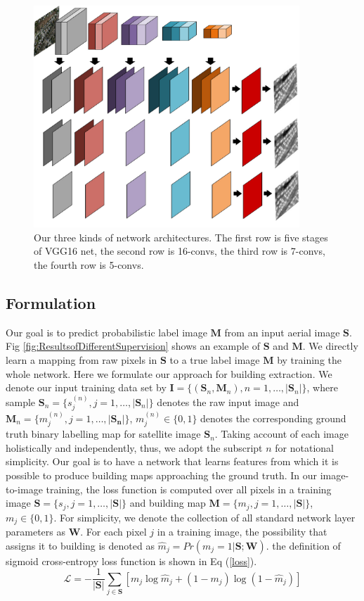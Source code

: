 \documentclass[runningheads]{llncs}
\begin{document}
\begin{figure}
\centering
\includegraphics[width=100mm]{ThreeFuseModes}
\caption{Our three kinds of network architectures. The first row is five stages of VGG16 net, the second row is 16-convs, the third row is 7-convs, the fourth row is 5-convs.}
\label{fig:ThreeFuseModes}
\end{figure}

\subsection{Formulation}
   Our goal is to predict probabilistic label image $\mathbf{M}$ from an input aerial image $\mathbf{S}$. Fig \ref{fig:ResultsofDifferentSupervision} shows an example of $\mathbf{S}$ and $\mathbf{M}$. We directly learn a mapping from raw pixels in $\mathbf{S}$ to a true label image  $\mathbf{M}$ by training the whole network. Here we formulate our approach for building extraction. We denote our input training data set by $\mathbf{I} = \{(\mathbf{S}_{n},\mathbf{M}_{n}),n = 1,\ldots,\vert \mathbf{S}_n \vert \}$, where sample $\mathbf{S}_{n} = \{s_{j}^{(n)}, j = 1,\ldots,\vert \mathbf{S}_n \vert \}$ denotes the raw input image and  $\mathbf{M}_{n} = \{m_{j}^{(n)}, j = 1,\ldots,\vert \mathbf{S_n} \vert\}$, $m_j^{(n)} \in \{0,1\}$ denotes the corresponding ground truth binary labelling map for satellite image $\mathbf{S}_{n}$.  Taking account of each image holistically and independently, thus, we adopt the subscript $n$ for notational simplicity. Our goal is to have a network that learns features from which it is possible to produce building maps approaching the ground truth. 
    In our image-to-image training, the loss function is computed over all pixels in a training image $\mathbf{S} = \{s_{j}, j = 1,\ldots,\vert \mathbf{S} \vert\}$ and building map $\mathbf{M} = \{m_{j}, j = 1,\ldots,\vert \mathbf{S} \vert\}$, $m_j \in \{0,1\}$.
For simplicity, we denote the collection of all standard network layer parameters as $\mathbf{W}$. For each pixel $j$ in a training image, the possibility that assigns it to building is denoted as $\hat{m}_j = Pr(m_j = 1|\mathbf{S};\mathbf{W})$. the definition of sigmoid cross-entropy loss function is shown in Eq (\ref{loss}).
\begin{equation}
	\label{loss}
    \mathcal{L} = - \frac{1}{\vert \mathbf{S} \vert} \sum_{j \in \mathbf{S}} \left[ m_j \log{\hat{m}_j} + (1 - m_j)\log{(1 - \hat{m}_j)} \right]
\end{equation}
\end{document}

